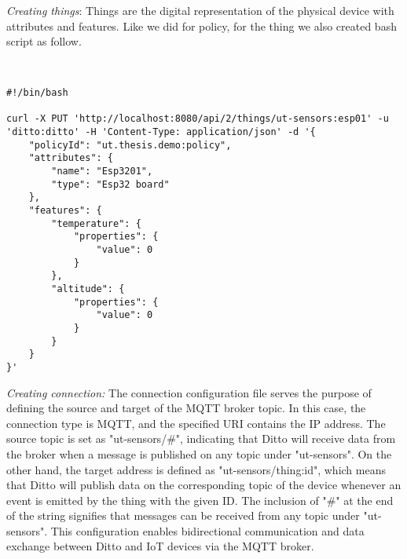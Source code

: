 \textit{Creating things}: Things are the digital representation of the physical device with attributes and features. Like we did for policy, for the thing we also created bash script as follow. 

\begin{lstlisting}[style=CStyle, caption={A Bash Script To Create Things in Ditto}]
    

#!/bin/bash

curl -X PUT 'http://localhost:8080/api/2/things/ut-sensors:esp01' -u 'ditto:ditto' -H 'Content-Type: application/json' -d '{
    "policyId": "ut.thesis.demo:policy",
    "attributes": {
        "name": "Esp3201",
        "type": "Esp32 board"
    },
    "features": {
        "temperature": {
            "properties": {
                "value": 0
            }
        },
        "altitude": {
            "properties": {
                "value": 0
            }
        }
    }
}'
\end{lstlisting}

\textit{Creating connection:} The connection configuration file serves the purpose of defining the source and target of the MQTT broker topic. In this case, the connection type is MQTT, and the specified URI contains the IP address. The source topic is set as "ut-sensors/\#", indicating that Ditto will receive data from the broker when a message is published on any topic under "ut-sensors". On the other hand, the target address is defined as "ut-sensors/{{thing:id}}", which means that Ditto will publish data on the corresponding topic of the device whenever an event is emitted by the thing with the given ID. The inclusion of "\#" at the end of the string signifies that messages can be received from any topic under "ut-sensors". This configuration enables bidirectional communication and data exchange between Ditto and IoT devices via the MQTT broker. 


